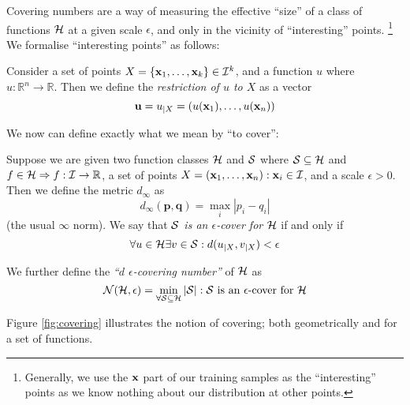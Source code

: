 Covering numbers are a way of measuring the effective ``size'' of a
class of functions $\mathcal{H}$ at a given scale $\epsilon$, and only
in the vicinity of ``interesting'' points.%
\footnote{Generally, we use the $\mathbf{x}$ part of our training samples as
the ``interesting'' points as we know nothing about our distribution
at other points.}  We formalise ``interesting points'' as follows:

\begin{definition}
\label{def:restriction}
Consider a set of points $X = \{\mathbf{x}_1, \ldots, \mathbf{x}_k\} \in \mathcal{I}^k$,
and a function $u$ where $u : \mathbb{R}^n \rightarrow \mathbb{R}$.  Then
we define the \emph{restriction of $u$ to $X$} as a vector
%
\begin{equation}
\mathbf{u} = u_{|X} = (u(\mathbf{x}_1), \ldots, u(\mathbf{x}_n))
\end{equation}
\end{definition}

We now can define exactly what we mean by ``to cover'':

\begin{definition}
\label{def:covering}
\label{def:covering numbers}
Suppose we are given two function classes $\mathcal{H}$ and $\mathcal{S}$ where $\mathcal{S}
\subseteq \mathcal{H}$ and $f \in \mathcal{H} \Rightarrow f : \mathcal{I} \rightarrow
\mathbb{R}$, a set of points $X = (\mathbf{x}_1, \ldots, \mathbf{x}_n) : \mathbf{x}_i \in
\mathcal{I}$, and a scale $\epsilon > 0$.  Then we define the metric
$d_{\infty}$ as 
%
\begin{equation}
d_{\infty}(\mathbf{p}, \mathbf{q}) = \max_{i} |p_i - q_i|
\end{equation}
%
(the usual $\infty$ norm).  We say that \emph{$\mathcal{S}$ is an
$\epsilon$-cover for $\mathcal{H}$} if and only if 
%
\begin{equation}
\forall u \in \mathcal{H} \exists v \in \mathcal{S} : d(u_{|X}, v_{|X}) < \epsilon
\end{equation}

We further define the \emph{``$d$ $\epsilon$-covering number''} of
$\mathcal{H}$ as
% 
\begin{equation}
\mathcal{N}({\mathcal{H}}, {\epsilon}) = \min_{\forall \mathcal{S} \subseteq
\mathcal{H}}|\mathcal{S}| : \mbox{$\mathcal{S}$ is an $\epsilon$-cover for $\mathcal{H}$}
\end{equation}
\end{definition}

Figure \ref{fig:covering} illustrates the notion of covering; both
geometrically and for a set of functions.

